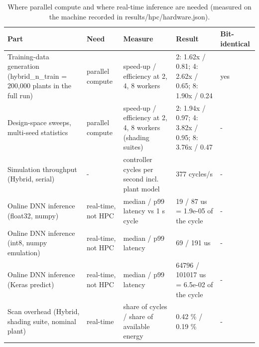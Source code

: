 \begin{table}[t]
\centering
\caption{Where parallel compute and where real-time inference are needed (measured on the machine recorded in results/hpc/hardware.json).}
\label{tab:Table_HPC}
\small
\begin{tabular}{lllll}
\hline
Part & Need & Measure & Result & Bit-identical \\
\hline
Training-data generation (hybrid\_n\_train = 200,000 plants in the full run) & parallel compute & speed-up / efficiency at 2, 4, 8 workers & 2: 1.62x / 0.81; 4: 2.62x / 0.65; 8: 1.90x / 0.24 & yes \\
Design-space sweeps, multi-seed statistics & parallel compute & speed-up / efficiency at 2, 4, 8 workers (shading suites) & 2: 1.94x / 0.97; 4: 3.82x / 0.95; 8: 3.76x / 0.47 & - \\
Simulation throughput (Hybrid, serial) & - & controller cycles per second incl. plant model & 377 cycles/s & - \\
Online DNN inference (float32, numpy) & real-time, not HPC & median / p99 latency vs 1 s cycle & 19 / 87 us = 1.9e-05 of the cycle & - \\
Online DNN inference (int8, numpy emulation) & real-time, not HPC & median / p99 latency & 69 / 191 us & - \\
Online DNN inference (Keras predict) & real-time, not HPC & median / p99 latency & 64796 / 101017 us = 6.5e-02 of the cycle & - \\
Scan overhead (Hybrid, shading suite, nominal plant) & real-time & share of cycles / share of available energy & 0.42 \% / 0.19 \% & - \\
\hline
\end{tabular}
\end{table}
